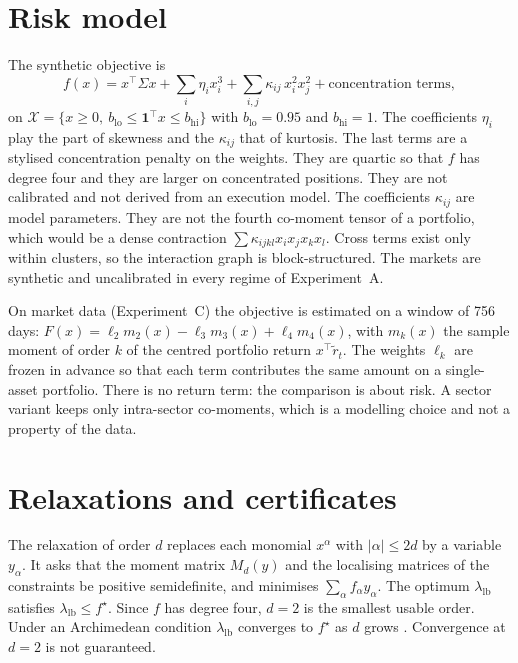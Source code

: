 \documentclass[11pt,a4paper]{article}
\newcommand{\lb}{\lambda_{\mathrm{lb}}}
\begin{document}
\section{Risk model}\label{sec:model}
The synthetic objective is
\begin{equation}
f(x)=x^\top\Sigma x+\sum_i\eta_i x_i^3+\sum_{i,j}\kappa_{ij}\,x_i^2x_j^2+\text{concentration terms},
\end{equation}
on $\mathcal{X}=\{x\ge 0,\ b_{\mathrm{lo}}\le \mathbf 1^\top x\le b_{\mathrm{hi}}\}$ with $b_{\mathrm{lo}}=0.95$ and $b_{\mathrm{hi}}=1$.
The coefficients $\eta_i$ play the part of skewness and the $\kappa_{ij}$ that of kurtosis.
The last terms are a stylised concentration penalty on the weights.
They are quartic so that $f$ has degree four and they are larger on concentrated positions.
They are not calibrated and not derived from an execution model.
The coefficients $\kappa_{ij}$ are model parameters.
They are not the fourth co-moment tensor of a portfolio, which would be a dense contraction $\sum\kappa_{ijkl}x_ix_jx_kx_l$.
Cross terms exist only within clusters, so the interaction graph is block-structured.
The markets are synthetic and uncalibrated in every regime of Experiment~A.

On market data (Experiment~C) the objective is estimated on a window of 756 days:
$F(x)=\ell_2 m_2(x)-\ell_3 m_3(x)+\ell_4 m_4(x)$, with $m_k(x)$ the sample moment of order $k$ of the centred portfolio return $x^\top\tilde r_t$.
The weights $\ell_k$ are frozen in advance so that each term contributes the same amount on a single-asset portfolio.
There is no return term: the comparison is about risk.
A sector variant keeps only intra-sector co-moments, which is a modelling choice and not a property of the data.

\section{Relaxations and certificates}
The relaxation of order $d$ replaces each monomial $x^\alpha$ with $|\alpha|\le 2d$ by a variable $y_\alpha$.
It asks that the moment matrix $M_d(y)$ and the localising matrices of the constraints be positive semidefinite, and minimises $\sum_\alpha f_\alpha y_\alpha$.
The optimum $\lb$ satisfies $\lb\le f^\star$.
Since $f$ has degree four, $d=2$ is the smallest usable order.
Under an Archimedean condition $\lb$ converges to $f^\star$ as $d$ grows \cite{lasserre2001,putinar1993}.
Convergence at $d=2$ is not guaranteed.
\end{document}
